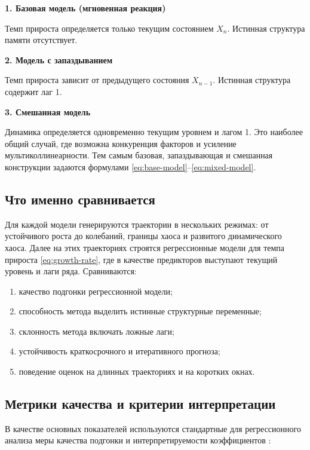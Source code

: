 \textbf{1. Базовая модель (мгновенная реакция)}

Темп прироста определяется только текущим состоянием \(X_n\). Истинная структура памяти отсутствует.

\textbf{2. Модель с запаздыванием}

Темп прироста зависит от предыдущего состояния \(X_{n-1}\). Истинная структура содержит лаг 1.

\textbf{3. Смешанная модель}

Динамика определяется одновременно текущим уровнем и лагом 1. Это наиболее общий случай, где возможна конкуренция факторов и усиление мультиколлинеарности. Тем самым базовая, запаздывающая и смешанная конструкции задаются формулами \eqref{eq:base-model}--\eqref{eq:mixed-model}.

\subsection{Что именно сравнивается}
\label{sec:chto-imenno-sravnivaetsya}

Для каждой модели генерируются траектории в нескольких режимах: от устойчивого роста до колебаний, границы хаоса и развитого динамического хаоса. Далее на этих траекториях строятся регрессионные модели для темпа прироста
\eqref{eq:growth-rate}, где в качестве предикторов выступают текущий уровень и лаги ряда. Сравниваются:

\begin{enumerate}
\def\labelenumi{\arabic{enumi}.}
\tightlist
\item
  качество подгонки регрессионной модели;
\item
  способность метода выделить истинные структурные переменные;
\item
  склонность метода включать ложные лаги;
\item
  устойчивость краткосрочного и итеративного прогноза;
\item
  поведение оценок на длинных траекториях и на коротких окнах.
\end{enumerate}

\subsection{Метрики качества и критерии интерпретации}
\label{sec:metriki-kachestva-i-kriterii-interpretatsii}

В качестве основных показателей используются стандартные для регрессионного анализа меры качества подгонки и интерпретируемости коэффициентов \cite{montgomery,wooldridge}:

